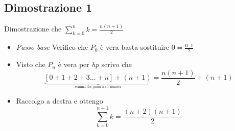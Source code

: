 \subsection{Dimostrazione 1}
\label{sub:dimostrazione1}
Dimostrazione che $\sum_{k=0}^{n} k = \frac{n\left( n+1 \right) }{2}$
\begin{itemize}
	\item \textit{Passo base} Verifico che $P_0$ è vera \rarr basta sostituire $0= \frac{0\cdot 1}{2}$
	\item Visto che $P_n$ è vera per \textit{hp} scrivo che \[
		      \underbrace{\left[ 0+1+2+3\ldots+n \right] +\left( n+1 \right)}_{_{\text{somma dei primi n+1 numeri}}} = \frac{n\left( n+1 \right) }{2} + \left( n+1 \right)
	      \]
	\item Raccolgo a destra e ottengo
	      \[
		      \sum_{k=0}^{n+1} k = \frac{\left( n+2 \right) \left( n+1 \right) }{2}
	      \]
\end{itemize}


